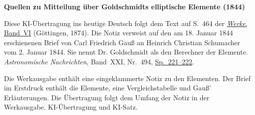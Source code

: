 \clearpage\thispagestyle{empty}
\begin{center}\textbf{Quellen zu Mitteilung über Goldschmidts elliptische Elemente (1844)}\end{center}
\noindent Diese KI-Übertragung ins heutige Deutsch folgt dem Text auf S.~464 der \href{https://gdz.sub.uni-goettingen.de/id/PPN236007467}{\textit{Werke}, Band~VI} (Göttingen, 1874). Die Notiz verweist auf den am 18. Januar 1844 erschienenen Brief von Carl Friedrich Gauß an Heinrich Christian Schumacher vom 2. Januar 1844. Sie nennt Dr. Goldschmidt als den Berechner der Elemente. \textit{Astronomische Nachrichten}, Band~XXI, Nr.~494, \href{https://api.digitale-sammlungen.de/iiif/image/v2/bsb10049446_00119/full/1800,/0/default.jpg}{Sp.~221--222}.
\par\smallskip\noindent Die Werkausgabe enthält eine eingeklammerte Notiz zu den Elementen. Der Brief im Erstdruck enthält die Elemente, eine Vergleichstabelle und Gauß’ Erläuterungen. Die Übertragung folgt dem Umfang der Notiz in der Werkausgabe. KI-Übertragung und KI-Satz.
\clearpage
